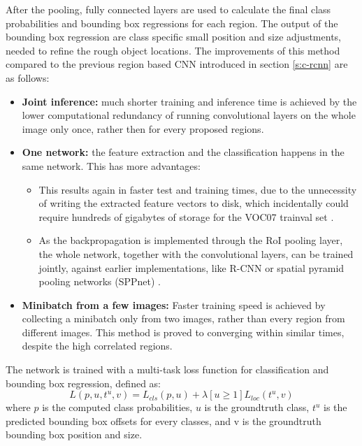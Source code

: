 After the pooling, fully connected layers are used to calculate the final class probabilities and bounding box regressions for each region. The output of the bounding box regression are class specific small position and size adjustments, needed to refine the rough object locations.
\smallbreak
The improvements of this method compared to the previous region based CNN introduced in section \ref{s:c-rcnn} are as follows:
\begin{itemize}
	\item\textbf{Joint inference:} much shorter training and inference time is achieved by the lower computational redundancy of running convolutional layers on the whole image only once, rather then for every proposed regions.
	\item\textbf{One network:} the feature extraction and the classification happens in the same network. This has more advantages:
	\begin{itemize}
	        \item This results again in faster test and training times, due to the unnecessity of writing the extracted feature vectors to disk, which incidentally could require hundreds of gigabytes of storage \cite{Girshick:2016:RCN:2881668.2882239} for the VOC07 trainval set \cite{pascal-voc-2007}.
	        \item As the backpropagation is implemented through the RoI pooling layer, the whole network, together with the convolutional layers, can be trained jointly, against earlier implementations, like R-CNN \cite{DBLP:journals/corr/GirshickDDM13} or spatial pyramid pooling networks (SPPnet) \cite{DBLP:journals/corr/HeZR014}.
	\end{itemize}
	\item\textbf{Minibatch from a few images:} Faster training speed is achieved by collecting a minibatch only from two images, rather than every region from different images. This method is proved to converging within similar times, despite the high correlated regions.
\end{itemize}
The network is trained with a multi-task loss function for classification and bounding box regression, defined as:
\begin{equation}\label{eq:c-frcnn-loss}
	L(p, u, t^u, v) = L_{cls}(p, u) + \lambda [u \ge 1] L_{loc}(t^u, v)
\end{equation}
where $p$ is the computed class probabilities, $u$ is the groundtruth class, $t^u$ is the predicted bounding box offsets for every classes, and v is the groundtruth bounding box position and size.
